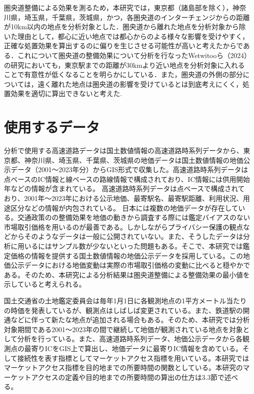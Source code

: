 \newpage
圏央道整備による効果を測るため，本研究では，東京都（諸島部を除く），神奈川県，埼玉県，千葉県，茨城県，かつ，各圏央道のインターチェンジからの距離が10km以内の地点を分析対象とした．圏央道から離れた地点を分析対象から除いた理由として，都心に近い地点では都心からのよる様々な影響を受けやすく，正確な処置効果を算出するのに偏りを生じさせる可能性が高いと考えたからである．これについて圏央道の整備効果について分析を行なったWetwitooら（2024）\cite{Weteitoo2024}の研究においても，東京駅までの距離が30kmより近い地点を分析対象に入れることで有意性が低くなることを明らかにしている．また，圏央道の外側の部分については，遠く離れた地点は圏央道の影響を受けているとは到底考えにくく，処置効果を適切に算出できないと考えた.

\section{使用するデータ}
分析で使用する高速道路データは国土数値情報の高速道路時系列データから、東京都、神奈川県、埼玉県、千葉県、茨城県の地価データは国土数値情報の地価公示データ（2001～2023年分）からGIS形式で収集した。高速道路時系列データは点ベースのIC情報と線ベースの路線情報で構成されており、IC情報には供用開始年などの情報が含まれている。
高速道路時系列データは点ベースで構成されており、2001年～2023年における公示地価、最寄駅名、最寄駅距離、利用状況、用途区分などの情報が内包されている。
日本には複数の地価データが存在している。交通政策のの整備効果を地価の動きから調査する際には鑑定バイアスのない市場取引価格を用いるのが最善である。しかしながらプライバシー保護の観点などからそのようなデータは一般に公開されていない。また、そうしたデータは分析に用いるにはサンプル数が少ないといった問題もある。そこで、本研究では鑑定価格の情報を提供する国土数値情報の地価公示データを採用している。\cite{shimizu2006}\cite{kunimi2021}この地価公示データにおける地価変動は実際の市場取引価格の変動に比べると穏やかである。そのため、本研究による分析結果は圏央道整備による整備効果の最小値を示していると考えられる。


国土交通省の土地鑑定委員会は毎年1月1日に各観測地点の1平方メートル当たりの時価を発表しているが、観測点はしばしば変更されている。また、鉄道駅の開通などに伴って新たな地点が追加される場合もある。そのため、本研究では分析対象期間である2001～2023年の間で継続して地価が観測されている地点を対象として分析を行っている。また、高速道路時系列データ、地価公示データから各観測点の最寄りICをGIS上で算出し、地価データに最寄りIC情報を含めている。そして接続性を表す指標としてマーケットアクセス指標を用いている。本研究ではマーケットアクセス指標を目的地までの所要時間の関数としている。本研究のマーケットアクセスの定義や目的地までの所要時間の算出の仕方は3.3節で述べる。
